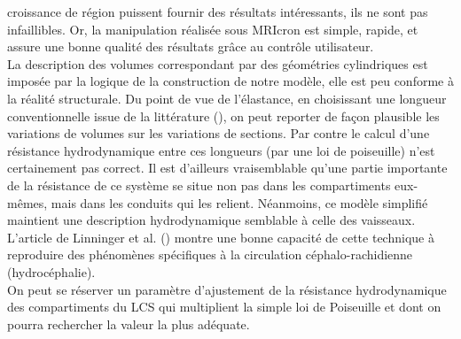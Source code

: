 croissance de région puissent fournir des résultats intéressants, ils ne sont pas infaillibles. Or, la
manipulation réalisée sous MRIcron est simple, rapide, et assure une bonne qualité des résultats grâce
au contrôle utilisateur.\\
La description des volumes correspondant par des géométries cylindriques est imposée par la
logique de la construction de notre modèle, elle est peu conforme à la réalité structurale. Du point de
vue de l’élastance, en choisissant une longueur conventionnelle issue de la littérature (\cite{Linninger2009}), on peut
reporter de façon plausible les variations de volumes sur les variations de sections. Par contre le calcul
d’une résistance hydrodynamique entre ces longueurs (par une loi de poiseuille) n’est certainement
pas correct. Il est d’ailleurs vraisemblable qu’une partie importante de la résistance de ce système se
situe non pas dans les compartiments eux-mêmes, mais dans les conduits qui les relient. Néanmoins,
ce modèle simplifié maintient une description hydrodynamique semblable à celle des vaisseaux.
L’article de Linninger et al. (\cite{Linninger2009}) montre une bonne capacité de cette technique à reproduire des
phénomènes spécifiques à la circulation céphalo-rachidienne (hydrocéphalie).\\
On peut se réserver un paramètre d’ajustement de la résistance hydrodynamique des
compartiments du LCS qui multiplient la simple loi de Poiseuille et dont on pourra rechercher la valeur
la plus adéquate.
